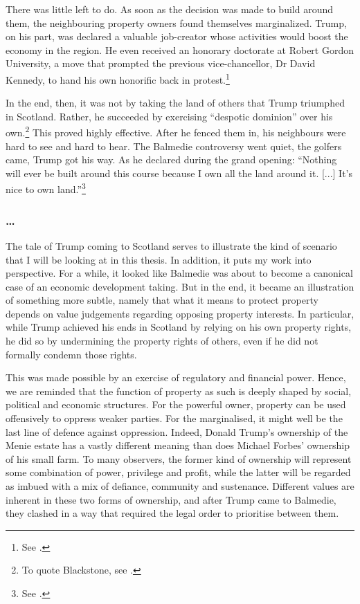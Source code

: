 There was little left to do. As soon as the decision was made to build around them, the neighbouring property owners found themselves marginalized. Trump, on his part, was declared a valuable job-creator whose activities would boost the economy in the region. He even received an honorary doctorate at Robert Gordon University, a move that prompted the previous vice-chancellor, Dr David Kennedy, to hand his own honorific back in protest.\footnote{See \cite{bbc10b}.}

In the end, then, it was not by taking the land of others that Trump triumphed in Scotland. Rather, he succeeded by exercising ``despotic dominion'' over his own.\footnote{To quote Blackstone, see \cite[2]{blackstone79b}.} This proved highly effective. After he fenced them in, his neighbours were hard to see and hard to hear. The Balmedie controversy went quiet, the golfers came, Trump got his way. As he declared during the grand opening: ``Nothing will ever be built around this course because I own all the land around it. [...] It's nice to own land.''\footnote{See \cite{booth12}.}

\subsubsection*{\ldots}

The tale of Trump coming to Scotland serves to illustrate the kind of scenario that I will be looking at in this thesis. In addition, it puts my work into perspective. For a while, it looked like Balmedie was about to become a canonical case of an economic development taking. But in the end, it became an illustration of something more subtle, namely that what it means to protect property depends on value judgements regarding opposing property interests. In particular, while Trump achieved his ends in Scotland by relying on his own property rights, he did so by undermining the property rights of others, even if he did not formally condemn those rights.

This was made possible by an exercise of regulatory and financial power. Hence, we are reminded that the function of property as such is deeply shaped by social, political and economic structures. For the powerful owner, property can be used offensively to oppress weaker parties. For the marginalised, it might well be the last line of defence against oppression. Indeed, Donald Trump's ownership of the Menie estate has a vastly different meaning than does Michael Forbes' ownership of his small farm. To many observers, the former kind of ownership will represent some combination of power, privilege and profit, while the latter will be regarded as imbued with a mix of defiance, community and sustenance. Different values are inherent in these two forms of ownership, and after Trump came to Balmedie, they clashed in a way that required the legal order to prioritise between them.

